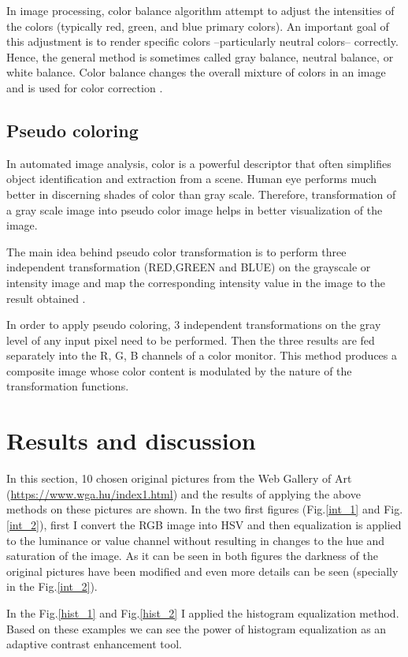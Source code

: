 \documentclass[conference]{IEEEtran}
\begin{document}
In image processing, color balance algorithm attempt to adjust the intensities of the colors (typically red, green, and blue primary colors). An important goal of this adjustment is to render specific colors  --particularly neutral colors-- correctly. Hence, the general method is sometimes called gray balance, neutral balance, or white balance. Color balance changes the overall mixture of colors in an image and is used for color correction \cite{wikiColorBalance}. 

\subsection{Pseudo coloring }
In automated image analysis, color is a powerful descriptor that often simplifies object identification and extraction from a scene. Human eye performs much better in discerning shades of color than gray scale. Therefore, transformation of a gray scale image into pseudo color image helps in better visualization of the image.

The main idea behind pseudo color transformation is to perform three independent transformation (RED,GREEN and BLUE) on the grayscale or intensity image and map  the corresponding intensity value in the image to the result obtained \cite{angel}.

In order to apply pseudo coloring, 3 independent transformations on the gray level of any input pixel need to be performed. Then the three results are fed separately into the R, G, B channels of a color monitor. 
This method produces a composite image whose color content is modulated by the nature of the transformation functions.


\section{Results and discussion}
In this section, 10 chosen original pictures from the Web Gallery of Art (\url{https://www.wga.hu/index1.html}) and the results of applying the above methods on these pictures are shown. 
In the two first figures (Fig.\ref{int_1} and Fig.\ref{int_2}), first I convert the RGB image into HSV and then equalization is applied to the luminance or value channel without resulting in changes to the hue and saturation of the image. As it can be seen in both figures the darkness of the original pictures have been modified and even more details can be seen (specially in the Fig.\ref{int_2}). 

In the Fig.\ref{hist_1} and Fig.\ref{hist_2} I applied the histogram equalization method. Based on these examples we can see the power of histogram equalization as an adaptive contrast enhancement tool.
\end{document}
